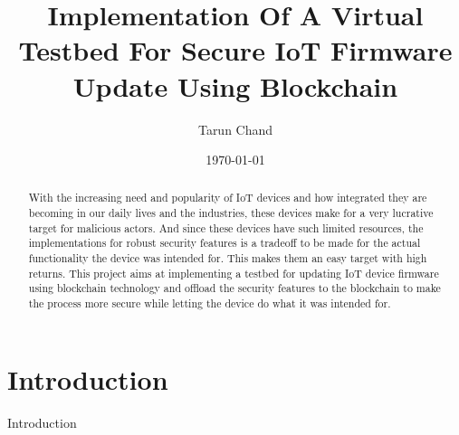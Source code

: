 \documentclass{article}
\title{Implementation Of A Virtual Testbed For Secure IoT Firmware Update Using Blockchain}
\author{Tarun Chand}
\date{\today}
\begin{document}
\maketitle

\begin{abstract}
    With the increasing need and popularity of IoT devices and how integrated they are becoming in our daily lives and the industries, these devices make for a very lucrative target for malicious actors. And since these devices have such limited resources, the implementations for robust security features is a tradeoff to be made for the actual functionality the device was intended for. This makes them an easy target with high returns. This project aims at implementing a testbed for updating IoT device firmware using blockchain technology and offload the security features to the blockchain to make the process more secure while letting the device do what it was intended for.
\end{abstract}

\tableofcontents

\newpage

\section{Introduction}
\label{sec:introduction}
Introduction
\end{document}
